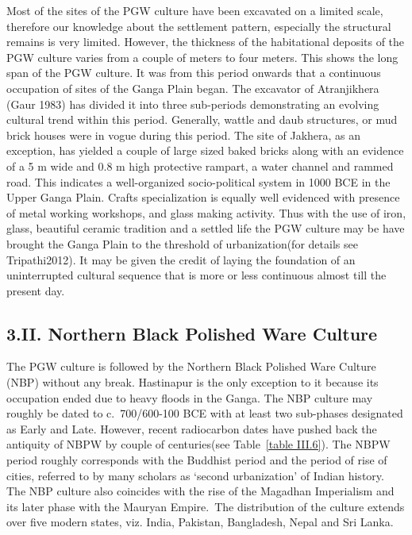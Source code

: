 Most of the sites of the PGW culture have been excavated on a limited scale, therefore our knowledge about the settlement pattern, especially the structural remains is very limited. However, the thickness of the habitational deposits of the PGW culture varies from a couple of meters to four meters. This shows the long span of the PGW culture. It was from this period onwards that a continuous occupation of sites of the Ganga Plain began. The excavator of Atranjikhera (Gaur 1983) has divided it into three sub-periods demonstrating an evolving cultural trend within this period. Generally, wattle and daub structures, or mud brick houses were in vogue during this period. The site of Jakhera, as an exception, has yielded a couple of large sized baked bricks along with an evidence of a 5 m wide and 0.8 m high protective rampart, a water channel and rammed road. This indicates a well-organized socio-political system in 1000 BCE in the Upper Ganga Plain. Crafts specialization is equally well evidenced with presence of metal working workshops, and glass making activity. Thus with the use of iron, glass, beautiful ceramic tradition and a settled life the PGW culture may be have brought the Ganga Plain to the threshold of urbanization(for details see Tripathi2012). It may be given the credit of laying the foundation of an uninterrupted cultural sequence that is more or less continuous almost till the present day.

\vspace{-.3cm}

\subsection*{3.II. Northern Black Polished Ware Culture}\label{subsection-9}

\vspace{-.2cm}

The PGW culture is followed by the Northern Black Polished Ware Culture (NBP) without any break. Hastinapur is the only exception to it because its occupation ended due to heavy floods in the Ganga. The NBP culture may roughly be dated to c.~700/600-100 BCE with at least two sub-phases designated as Early and Late. However, recent radiocarbon dates have pushed back the antiquity of NBPW by couple of centuries(see Table~\ref{table III.6}). The NBPW period roughly corresponds with the Buddhist period and the period of rise of cities, referred to by many scholars as `second urbanization' of Indian history. The NBP culture also coincides with the rise of the Magadhan Imperialism and its later phase with the Mauryan Empire.~The distribution of the culture extends over five modern states, viz. India, Pakistan, Bangladesh, Nepal and Sri Lanka.

